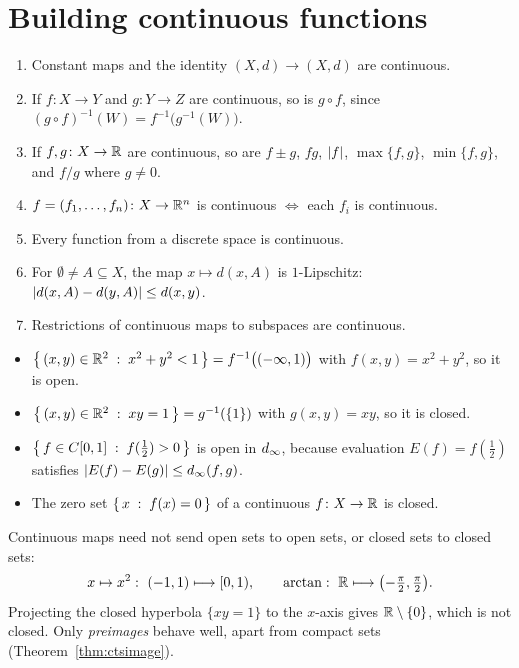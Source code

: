 \section{Building continuous functions}
\begin{proposition}\label{prop:build}
\leavevmode
\begin{enumerate}[label=(\roman*)]
  \item Constant maps and the identity $(X,d)\to(X,d)$ are continuous.
  \item If $f\colon X\to Y$ and $g\colon Y\to Z$ are continuous, so is $g\circ f$, since $(g\circ f)^{-1}(W)=f^{-1}\bigl(g^{-1}(W)\bigr)$.
  \item If $f,g\colon X\to\mathbb{R}$ are continuous, so are $f\pm g$, $fg$, $\left\lvert f\right\rvert$, $\max\{f,g\}$, $\min\{f,g\}$, and $f/g$ where $g\ne0$.
  \item $f=(f_1,\dots,f_n)\colon X\to\mathbb{R}^n$ is continuous $\iff$ each $f_i$ is continuous.
  \item Every function from a discrete space is continuous.
  \item For $\emptyset\ne A\subseteq X$, the map $x\mapsto d(x,A)$ is $1$-Lipschitz: $\left\lvert d(x,A)-d(y,A)\right\rvert\le d(x,y)$.
  \item Restrictions of continuous maps to subspaces are continuous.
\end{enumerate}
\end{proposition}

\begin{example}
\leavevmode
\begin{itemize}
  \item $\left\{\, (x,y)\in\mathbb{R}^2 \;:\; x^2+y^2<1 \,\right\}=f^{-1}\bigl((-\infty,1)\bigr)$ with $f(x,y)=x^2+y^2$, so it is open.
  \item $\left\{\, (x,y)\in\mathbb{R}^2 \;:\; xy=1 \,\right\}=g^{-1}(\{1\})$ with $g(x,y)=xy$, so it is closed.
  \item $\left\{\, f\in C[0,1] \;:\; f(\tfrac12)>0 \,\right\}$ is open in $d_\infty$, because evaluation $E(f)=f(\tfrac12)$ satisfies $\left\lvert E(f)-E(g)\right\rvert\le d_\infty(f,g)$.
  \item The zero set $\left\{\, x \;:\; f(x)=0 \,\right\}$ of a continuous $f\colon X\to\mathbb{R}$ is closed.
\end{itemize}
\end{example}

\begin{warning}
Continuous maps need not send open sets to open sets, or closed sets to closed sets:
\[
  x\mapsto x^2:\ (-1,1)\longmapsto[0,1),
  \qquad
  \arctan:\ \R\longmapsto\bigl(-\tfrac\pi2,\tfrac\pi2\bigr).
\]
Projecting the closed hyperbola $\{xy=1\}$ to the $x$-axis gives $\mathbb{R}\setminus\{0\}$, which is not closed. Only \emph{preimages} behave well, apart from compact sets (Theorem~\ref{thm:ctsimage}).
\end{warning}

